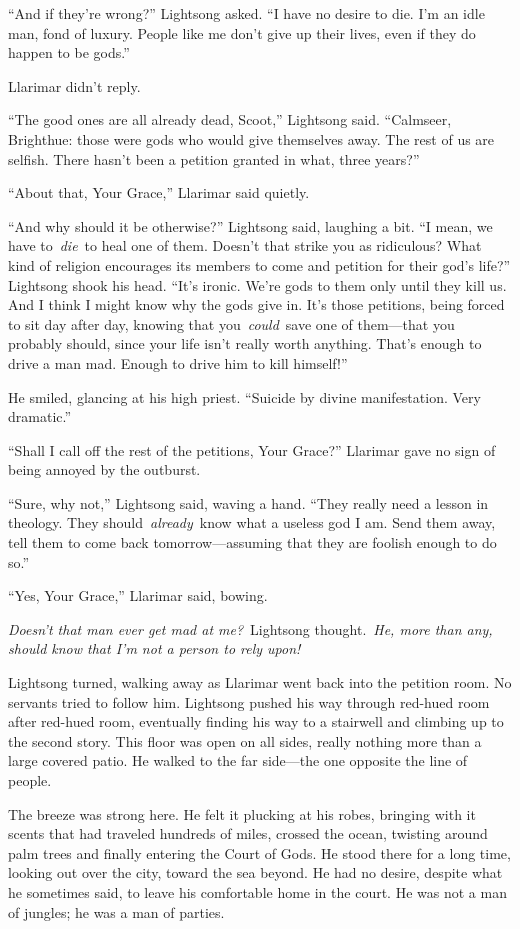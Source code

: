 “And if they’re wrong?” Lightsong asked. “I have no desire to die. I’m an idle man, fond of luxury. People like me don’t give up their lives, even if they do happen to be gods.”

Llarimar didn’t reply.

“The good ones are all already dead, Scoot,” Lightsong said. “Calmseer, Brighthue: those were gods who would give themselves away. The rest of us are selfish. There hasn’t been a petition granted in what, three years?”

“About that, Your Grace,” Llarimar said quietly.

“And why should it be otherwise?” Lightsong said, laughing a bit. “I mean, we have to~\textit{die}~to heal one of them. Doesn’t that strike you as ridiculous? What kind of religion encourages its members to come and petition for their god’s life?” Lightsong shook his head. “It’s ironic. We’re gods to them only until they kill us. And I think I might know why the gods give in. It’s those petitions, being forced to sit day after day, knowing that you~\textit{could}~save one of them—that you probably should, since your life isn’t really worth anything. That’s enough to drive a man mad. Enough to drive him to kill himself!”

He smiled, glancing at his high priest. “Suicide by divine manifestation. Very dramatic.”

“Shall I call off the rest of the petitions, Your Grace?” Llarimar gave no sign of being annoyed by the outburst.

“Sure, why not,” Lightsong said, waving a hand. “They really need a lesson in theology. They should~\textit{already}~know what a useless god I am. Send them away, tell them to come back tomorrow—assuming that they are foolish enough to do so.”

“Yes, Your Grace,” Llarimar said, bowing.

\textit{Doesn’t that man ever get mad at me?}~Lightsong thought.~\textit{He, more than any, should know that I’m not a person to rely upon!}

Lightsong turned, walking away as Llarimar went back into the petition room. No servants tried to follow him. Lightsong pushed his way through red-hued room after red-hued room, eventually finding his way to a stairwell and climbing up to the second story. This floor was open on all sides, really nothing more than a large covered patio. He walked to the far side—the one opposite the line of people.

The breeze was strong here. He felt it plucking at his robes, bringing with it scents that had traveled hundreds of miles, crossed the ocean, twisting around palm trees and finally entering the Court of Gods. He stood there for a long time, looking out over the city, toward the sea beyond. He had no desire, despite what he sometimes said, to leave his comfortable home in the court. He was not a man of jungles; he was a man of parties.


